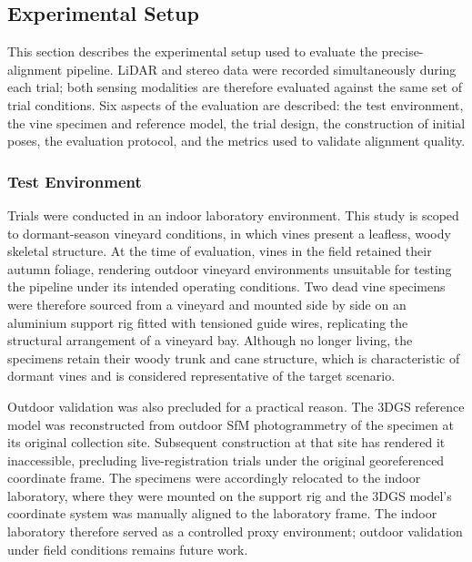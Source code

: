 \subsection{Experimental Setup}
\label{subsec:pa-experimental-setup}

This section describes the experimental setup used to evaluate the precise-alignment pipeline. LiDAR and stereo data were recorded simultaneously during each trial; both sensing modalities are therefore evaluated against the same set of trial conditions. Six aspects of the evaluation are described: the test environment, the vine specimen and reference model, the trial design, the construction of initial poses, the evaluation protocol, and the metrics used to validate alignment quality.

\subsubsection{Test Environment}
\label{subsubsec:pa-test-environment}

Trials were conducted in an indoor laboratory environment. This study is scoped to dormant-season vineyard conditions, in which vines present a leafless, woody skeletal structure. At the time of evaluation, vines in the field retained their autumn foliage, rendering outdoor vineyard environments unsuitable for testing the pipeline under its intended operating conditions. Two dead vine specimens were therefore sourced from a vineyard and mounted side by side on an aluminium support rig fitted with tensioned guide wires, replicating the structural arrangement of a vineyard bay. Although no longer living, the specimens retain their woody trunk and cane structure, which is characteristic of dormant vines and is considered representative of the target scenario.

Outdoor validation was also precluded for a practical reason. The 3DGS reference model was reconstructed from outdoor SfM photogrammetry of the specimen at its original collection site. Subsequent construction at that site has rendered it inaccessible, precluding live-registration trials under the original georeferenced coordinate frame. The specimens were accordingly relocated to the indoor laboratory, where they were mounted on the support rig and the 3DGS model's coordinate system was manually aligned to the laboratory frame. The indoor laboratory therefore served as a controlled proxy environment; outdoor validation under field conditions remains future work.

